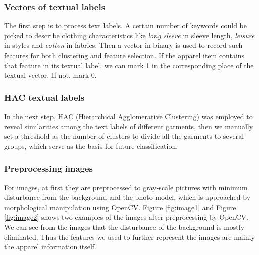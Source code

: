 \subsubsection{Vectors of textual labels}
The first step is to process text labels. A certain number of keywords could be picked to describe clothing characteristics like \emph{long sleeve} in sleeve length, \emph{leisure} in styles and \emph{cotton} in fabrics. Then a vector in binary is used to record such features for both clustering and feature selection. If the apparel item contains that feature in its textual label, we can mark 1 in the corresponding place of the textual vector. If not, mark 0.

\subsubsection{HAC textual labels}
In the next step, HAC (Hierarchical Agglomerative Clustering) was employed to reveal similarities among the text labels of different 
garments, then we manually set a threshold as the number of clusters to divide all the garments to several groups, which serve as the basis for future classification.

\subsubsection{Preprocessing images}
For images, at first they are preprocessed to gray-scale pictures with minimum disturbance from the background and the photo model, which is approached by morphological manipulation using OpenCV. Figure \ref{fig:image1} and Figure \ref{fig:image2} shows two examples of the images after preprocessing by OpenCV. We can see from the images that the disturbance of the background is mostly eliminated. Thus the features we used to further represent the images are mainly the apparel information itself.

